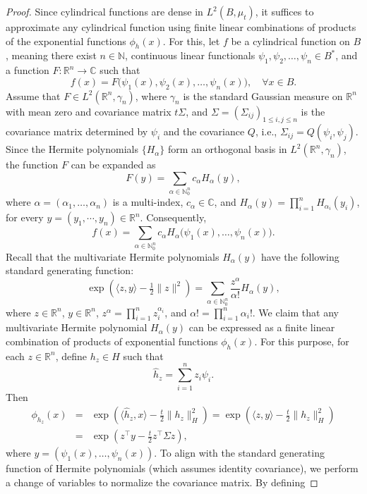 \documentclass[10pt,a4paper]{amsart}
\begin{document}
\begin{proof}
Since cylindrical functions are dense in \( L^2(B, \mu_t) \), it suffices to approximate any cylindrical function using finite linear combinations of products of the exponential functions \( \phi_h(x) \). For this, let \( f \) be a cylindrical function on \( B \), meaning there exist \( n \in \mathbb{N} \), continuous linear functionals \( \psi_1, \psi_2, \dots, \psi_n \in B^* \), and a function \( F: \mathbb{R}^n \to \mathbb{C} \) such that
\[
f(x) = F\big( \psi_1(x), \psi_2(x), \dots, \psi_n(x) \big), \quad \forall x \in B.
\]
Assume that \( F \in L^2(\mathbb{R}^n, \gamma_n) \), where \( \gamma_n \) is the standard Gaussian measure on \( \mathbb{R}^n \) with mean zero and covariance matrix \( t \Sigma \), and \( \Sigma=(\Sigma_{ij})_{1\leq i,j\leq n} \) is the covariance matrix determined by \( \psi_i \) and the covariance \( Q \), i.e., \(
\Sigma_{ij} = Q(\psi_i, \psi_j).
\) Since the Hermite polynomials \( \{ H_\alpha \} \) form an orthogonal basis in \( L^2(\mathbb{R}^n, \gamma_n) \), the function \( F \) can be expanded as
\[
F(y) = \sum_{\alpha \in \mathbb{N}_0^n} c_\alpha H_\alpha(y),
\]
where \( \alpha = (\alpha_1, \dots, \alpha_n) \) is a multi-index, \( c_\alpha \in \mathbb{C} \), and \( H_\alpha(y) = \prod_{i=1}^n H_{\alpha_i}(y_i) \), for every \(y=(y_1,\cdots, y_n)\in\mathbb{R}^n.\)   Consequently,
\[
f(x) = \sum_{\alpha \in \mathbb{N}_0^n} c_\alpha H_\alpha\big( \psi_1(x), \dots, \psi_n(x) \big).
\]
Recall that the multivariate Hermite polynomials \( H_\alpha(y) \) have the following standard generating function:
\[
\exp\left( \langle z, y \rangle - \tfrac{1}{2} \| z \|^2 \right) = \sum_{\alpha \in \mathbb{N}_0^n} \frac{z^\alpha}{\alpha!} H_\alpha(y),
\]
where \( z \in \mathbb{R}^n \), \( y \in \mathbb{R}^n \), \( z^\alpha = \prod_{i=1}^n z_i^{\alpha_i} \), and \( \alpha! = \prod_{i=1}^n \alpha_i! \).
We claim that any multivariate Hermite polynomial \( H_\alpha(y) \) can be expressed as a finite linear combination of products of exponential functions \( \phi_h(x) \). For this purpose, for each \( z \in \mathbb{R}^n \), define \( h_z \in H \) such that
\[
\hat{h}_z = \sum_{i=1}^n z_i \psi_i.
\]
Then
\begin{eqnarray*}
\phi_{h_z}(x) &=& \exp\left( \langle \hat{h}_z, x \rangle - \tfrac{t}{2} \| h_z \|_H^2 \right) = \exp\left( \langle z, y \rangle - \tfrac{t}{2} \| h_z \|_H^2 \right)
\\&=& \exp\left(  z^\top y - \tfrac{t}{2} z^\top \Sigma z \right),\end{eqnarray*} where \( y = (\psi_1(x), \dots, \psi_n(x)) \).  To align with the standard generating function of Hermite polynomials (which assumes identity covariance), we perform a change of variables to normalize the covariance matrix. By defining

\end{proof}
\end{document}
